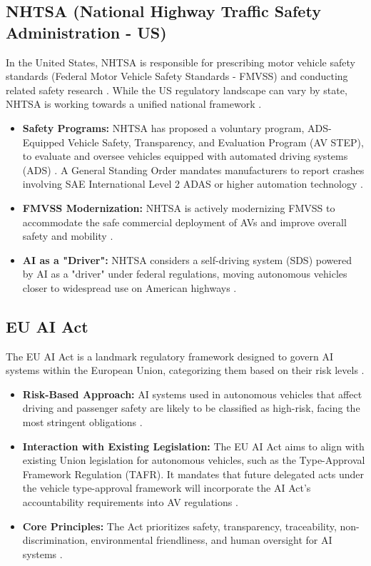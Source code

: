 \subsection{NHTSA (National Highway Traffic Safety Administration - US)}
In the United States, NHTSA is responsible for prescribing motor vehicle safety standards (Federal Motor Vehicle Safety Standards - FMVSS) and conducting related safety research \cite{Sidley_NHTSA}. While the US regulatory landscape can vary by state, NHTSA is working towards a unified national framework \cite{AIMagazine_NHTSA}.
\begin{itemize}
    \item \textbf{Safety Programs:} NHTSA has proposed a voluntary program, ADS-Equipped Vehicle Safety, Transparency, and Evaluation Program (AV STEP), to evaluate and oversee vehicles equipped with automated driving systems (ADS) \cite{VarnumLaw_NHTSA}. A General Standing Order mandates manufacturers to report crashes involving SAE International Level 2 ADAS or higher automation technology \cite{RepairerDrivenNews_NHTSA}.
    \item \textbf{FMVSS Modernization:} NHTSA is actively modernizing FMVSS to accommodate the safe commercial deployment of AVs and improve overall safety and mobility \cite{CleanTechnica_NHTSA}.
    \item \textbf{AI as a "Driver":} NHTSA considers a self-driving system (SDS) powered by AI as a "driver" under federal regulations, moving autonomous vehicles closer to widespread use on American highways \cite{EETimes_NHTSA}.
\end{itemize}

\subsection{EU AI Act}
The EU AI Act is a landmark regulatory framework designed to govern AI systems within the European Union, categorizing them based on their risk levels \cite{HolisticAI_EU_AI_Act}.
\begin{itemize}
    \item \textbf{Risk-Based Approach:} AI systems used in autonomous vehicles that affect driving and passenger safety are likely to be classified as high-risk, facing the most stringent obligations \cite{EuropaEU_EU_AI_Act}.
    \item \textbf{Interaction with Existing Legislation:} The EU AI Act aims to align with existing Union legislation for autonomous vehicles, such as the Type-Approval Framework Regulation (TAFR). It mandates that future delegated acts under the vehicle type-approval framework will incorporate the AI Act's accountability requirements into AV regulations \cite{TaylorWessing_EU_AI_Act, TwoBirds_EU_AI_Act}.
    \item \textbf{Core Principles:} The Act prioritizes safety, transparency, traceability, non-discrimination, environmental friendliness, and human oversight for AI systems \cite{EuropaEU_EU_AI_Act}.
\end{itemize}

